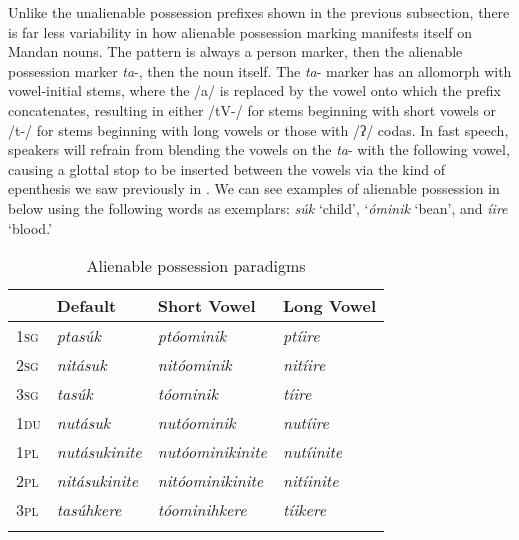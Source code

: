 Unlike the unalienable possession prefixes shown in the previous subsection, there is far less variability in how alienable possession marking manifests itself on Mandan nouns. The pattern is always a person marker, then the alienable possession marker \textit{ta}-, then the noun itself. The \textit{ta}- marker has an allomorph with vowel-initial stems, where the /a/ is replaced by the vowel onto which the prefix concatenates, resulting in either /tV-/ for stems beginning with short vowels or /t-/ for stems beginning with long vowels or those with /ʔ/ codas. In fast speech, speakers will refrain from blending the vowels on the \textit{ta}- with the following vowel, causing a glottal stop to be inserted between the vowels via the kind of epenthesis we saw previously in . We can see examples of alienable possession in  below using the following words as exemplars: \textit{súk} `child', `\textit{óminik} `bean', and \textit{íire} `blood.'

\begin{table}
        \caption{Alienable possession paradigms}\label{TableAlienableParadigm}
    \begin{tabular}{llll}
\lsptoprule
    ~&  \textbf{Default}&   \textbf{Short Vowel}&   \textbf{Long Vowel}\\
\midrule
    \textsc{1sg}&   \textit{ptasúk}&  \textit{ptóominik}&
        \textit{ptíire}\\
    \textsc{2sg}&   \textit{nitásuk}&  \textit{nitóominik}&
        \textit{nitíire}\\
    \textsc{3sg}&   \textit{tasúk}&  \textit{tóominik}&
        \textit{tíire}\\
    \textsc{1du}&   \textit{nutásuk}&  \textit{nutóominik}&
        \textit{nutíire}\\
    \textsc{1pl}&   \textit{nutásukinite}&  \textit{nutóominikinite}&
        \textit{nutíinite}\\
    \textsc{2pl}&   \textit{nitásukinite}&  \textit{nitóominikinite}&
        \textit{nitíinite}\\
    \textsc{3pl}&   \textit{tasúhkere}&  \textit{tóominihkere}&
        \textit{tíikere}\\
    \lspbottomrule
    \end{tabular}

\end{table}

